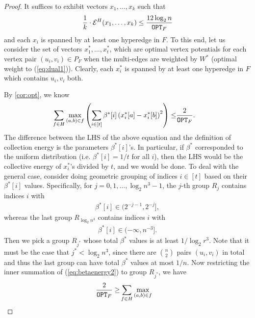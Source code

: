 \documentclass{article}
\begin{document}
\begin{proof}
    It suffices to exhibit vectors $x_1,\ldots,x_k$ such that
    \begin{align}\label{eq:goal1}
        \frac{1}{k}\cdot \mathcal{E}^H(x_1,\ldots,x_k) \leq \frac{12\log_2 n}{\mathtt{OPT}_F}
    \end{align}
    and each $x_i$ is spanned by at least one hyperedge in $F$.
    To this end, let us consider the set of vectors
    $x_1^*,\ldots,x_t^*$, which are optimal vertex potentials
    for each vertex pair $(u_i,v_i)\in P_F$ when the multi-edges are weighted by $W^*$
    (optimal weight to (\ref{eq:dual1})).
    Clearly, each $x^{*}_{i}$ is spanned by at least one hyperedge in $F$
    which contains $u_i,v_i$ both.
    
    By \cref{cor:opt}, we know
        \begin{align}\label{eq:betaenergy2}
        \sum_{f\in H}
        \max_{(a,b)\in f}
        \left( \sum_{i\in [t]} \beta^*[i] \left(x_{i}^{*}[a] - x_{i}^{*}[b]\right)^2 \right)
        \leq & \frac{2}{\mathtt{OPT}_F}.
    \end{align}
    The difference between the LHS of the above equation
    and the definition of collection energy
    is the parameters $\beta^*[i]$'s.
    In particular, if $\beta^*$  corresponded to the uniform distribution (i.e. $\beta^*[i]=1/t$ for all $i$),
    then the LHS would be the collective energy of $x_{i}^{*}$'s divided by $t$,
    and we would be done.
    To deal with the general case, consider doing geometric grouping of indices $i\in [t]$
    based on their $\beta^*[i]$ values.
    Specifically, for $j=0,1,\ldots,\log_2 n^3 - 1$,
    the $j$-th group $R_j$ contains indices $i$ with
    \begin{align*}
        \beta^*[i] \in (2^{-j-1}, 2^{-j}],
    \end{align*}
    whereas the last group $R_{\log_2 n^3}$ contains indices $i$ with
    \begin{align*}
        \beta^*[i] \in (-\infty, n^{-3}].
    \end{align*}
    Then we pick a group $R_{j^*}$ whose total $\beta^*$ values
    is at least $1/\log_2 r^3$. Note that it must be the case that
    $j^* < \log_2 n^3$, since there are $\binom{n}{2}$ pairs $(u_i,v_i)$ in total
    and thus the last group can have total $\beta^*$ values at most  $1/n$.
    Now restricting the inner summation of (\ref{eq:betaenergy2}) to
    group $R_{j^*}$, we have
    \begin{align*}
        \frac{2}{\OPT_F} \geq
        &\sum_{f\in H}
        \max_{(a,b)\in f}

\end{align*}
\end{proof}
\end{document}
